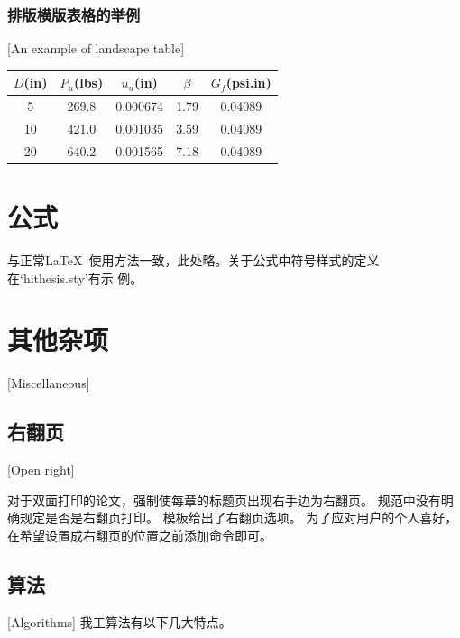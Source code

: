\subsubsection{排版横版表格的举例}[An example of landscape table]

\begin{table}[p]
\centering
\begin{sideways}
\begin{minipage}{\textheight}
\vspace{0.5em}\centering\wuhao
\begin{tabular}{ccccc}
\toprule
$D$(in) & $P_u$(lbs) & $u_u$(in) & $\beta$ & $G_f$(psi.in)\\
\midrule
 5 & 269.8 & 0.000674 & 1.79 & 0.04089\\
10 & 421.0 & 0.001035 & 3.59 & 0.04089\\
20 & 640.2 & 0.001565 & 7.18 & 0.04089\\
\bottomrule
\end{tabular}
\end{minipage}
\end{sideways}
\end{table}


\section{公式}
与正常\LaTeX\ 使用方法一致，此处略。关于公式中符号样式的定义在`hithesis.sty'有示
例。

\section{其他杂项}[Miscellaneous]

\subsection{右翻页}[Open right]

对于双面打印的论文，强制使每章的标题页出现右手边为右翻页。
规范中没有明确规定是否是右翻页打印。
模板给出了右翻页选项。
为了应对用户的个人喜好，在希望设置成右翻页的位置之前添加命令即可。

\subsection{算法}[Algorithms]
我工算法有以下几大特点。


